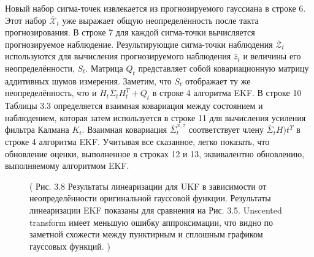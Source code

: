 \documentclass[10pt,a4paper]{article}
\begin{document}
Новый набор сигма-точек извлекается из прогнозируемого гауссиана в строке 6. Этот набор  $\bar{\mathcal X}_t$ уже выражает общую неопределённость после такта прогнозирования. В строке 7 для каждой сигма-точки вычисляется прогнозируемое наблюдение. Результирующие сигма-точки наблюдения $\bar{\mathcal Z}_t$ используются для вычисления прогнозируемого наблюдения $\hat{z}_t$ и величины его неопределённости, $S_t$. Матрица $Q_t$ представляет собой ковариационную матрицу аддитивных шумов измерения. Заметим, что $S_t$ отображает ту же неопределённость, что и $H_t \bar{\varSigma}_t  H_t^T + Q_t$ в строке 4 алгоритма EKF. В строке 10 Таблицы 3.3 определяется взаимная ковариация между состоянием и наблюдением, которая затем используется в строке 11 для вычисления усиления фильтра Калмана $K_t$. Взаимная ковариация $\bar{\varSigma}_t^{x,z}$ соответствует члену $\bar{\varSigma}_t H)t^T$ в строке 4 алгоритма EKF. Учитывая все сказанное, легко показать, что обновление оценки, выполненное в строках 12 и 13, эквивалентно обновлению, выполняемому алгоритмом EKF.\\

\begin{figure}[H]
	\caption{ (  Рис. 3.8 Результаты линеаризации для UKF в зависимости от неопределённости оригинальной гауссовой функции. Результаты линеаризации EKF показаны для сравнения на Рис. 3.5. Unscented transform имеет меньшую ошибку аппроксимации, что видно по заметной схожести между пунктирным и сплошным графиком гауссовых функций. )}
	\label{fig:38orig}
\end{figure}
\end{document}
